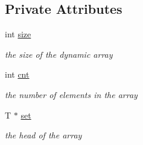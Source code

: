 \subsection*{Private Attributes}
\begin{DoxyCompactItemize}
\item 
\hypertarget{classplist_1_1PointerArray_a98162fd2afd7b2b2a77d0ffc30d7ae9b}{int \hyperlink{classplist_1_1PointerArray_a98162fd2afd7b2b2a77d0ffc30d7ae9b}{size}}\label{classplist_1_1PointerArray_a98162fd2afd7b2b2a77d0ffc30d7ae9b}

\begin{DoxyCompactList}\small\item\em the size of the dynamic array \end{DoxyCompactList}\item 
\hypertarget{classplist_1_1PointerArray_a020e1bba816263fda11f39f3fd94df56}{int \hyperlink{classplist_1_1PointerArray_a020e1bba816263fda11f39f3fd94df56}{cnt}}\label{classplist_1_1PointerArray_a020e1bba816263fda11f39f3fd94df56}

\begin{DoxyCompactList}\small\item\em the number of elements in the array \end{DoxyCompactList}\item 
\hypertarget{classplist_1_1PointerArray_adf1c1c63825cab435baf7f4a998cc869}{T $\ast$ \hyperlink{classplist_1_1PointerArray_adf1c1c63825cab435baf7f4a998cc869}{set}}\label{classplist_1_1PointerArray_adf1c1c63825cab435baf7f4a998cc869}

\begin{DoxyCompactList}\small\item\em the head of the array \end{DoxyCompactList}\end{DoxyCompactItemize}
